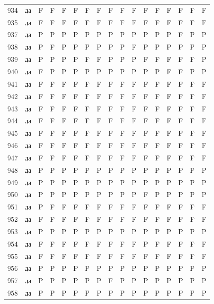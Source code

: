 \begin{table}[p]
\begin{tabular*}{\textwidth}{@{\extracolsep{\fill}}rcccccccccccccccc}
934 & да & F & F & F & F & F & F & F & F & F & F & F & F & F & F & F\\
935 & да & F & F & F & F & F & F & F & F & F & F & F & F & F & F & F\\
937 & да & P & P & P & P & P & P & P & P & P & P & P & P & F & P & P\\
938 & да & P & F & P & P & P & P & P & P & F & P & P & P & P & P & P\\
939 & да & P & P & P & P & F & F & P & P & P & F & F & F & F & F & P\\
940 & да & F & P & P & P & P & P & P & P & P & P & P & F & F & P & P\\
941 & да & F & F & F & F & F & F & F & F & F & F & F & F & F & F & F\\
942 & да & F & F & F & F & F & F & F & F & F & F & F & F & F & F & F\\
943 & да & F & F & F & F & F & F & F & F & F & F & F & F & F & F & F\\
944 & да & F & F & F & F & F & F & F & F & F & F & F & F & F & F & F\\
945 & да & F & F & F & F & F & F & F & F & F & F & F & F & F & F & F\\
946 & да & F & F & F & F & F & F & F & F & F & F & F & F & F & F & F\\
947 & да & F & F & F & F & F & F & F & F & F & F & F & F & F & F & F\\
948 & да & P & P & P & P & P & P & P & P & P & P & P & P & P & P & P\\
949 & да & P & P & P & P & P & P & P & P & P & P & P & P & P & P & P\\
950 & да & P & P & P & P & P & P & P & P & P & F & P & P & P & P & P\\
951 & да & P & F & F & F & F & F & F & F & F & F & F & F & F & F & F\\
952 & да & F & F & F & F & F & F & F & F & F & F & F & F & F & F & F\\
953 & да & P & P & P & P & P & P & P & P & P & P & P & P & P & P & P\\
954 & да & F & F & F & F & F & F & F & F & F & P & F & F & F & F & F\\
955 & да & F & F & F & F & F & F & F & F & F & F & F & F & F & F & F\\
956 & да & P & P & P & P & P & P & P & P & P & P & P & P & P & P & P\\
957 & да & P & P & P & P & P & P & F & P & P & P & P & P & P & P & P\\
958 & да & P & P & P & P & P & P & P & P & P & P & P & P & P & P & P\\
\bottomrule\end{tabular*}\end{table}
\clearpage

